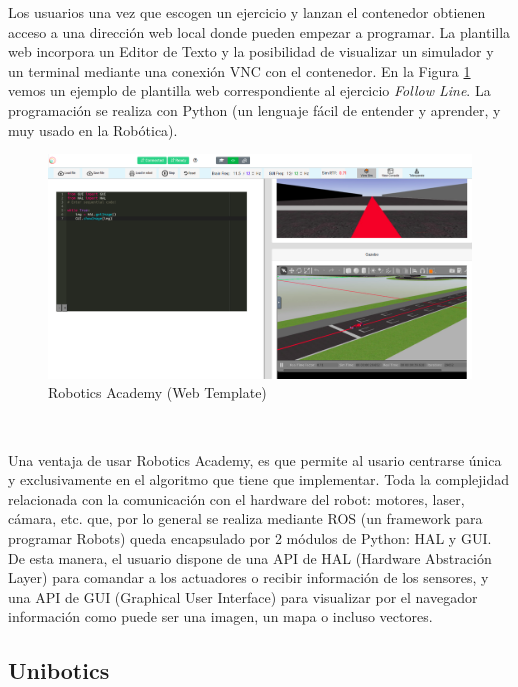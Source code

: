 Los usuarios una vez que escogen un ejercicio y lanzan el contenedor obtienen acceso a una dirección web local donde pueden empezar a programar. La plantilla web incorpora un Editor de Texto y la posibilidad de visualizar un simulador y un terminal mediante una conexión VNC con el contenedor. En la Figura \ref{fig:rob-ac-web-template} vemos un ejemplo de plantilla web correspondiente al ejercicio \textit{Follow Line}. La programación se realiza con Python (un lenguaje fácil de entender y aprender, y muy usado en la Robótica).\\

\begin{figure} [H]
  \begin{center}
    \includegraphics[width=12cm]{imagenes/cap1/robotics-academy-web-template.png}
  \end{center}
  \caption[Robotics Academy (Web Template)]{Robotics Academy (Web Template)}
  \label{fig:rob-ac-web-template}
\end{figure}\

Una ventaja de usar Robotics Academy, es que permite al usario centrarse única y exclusivamente en el algoritmo que tiene que implementar. Toda la complejidad relacionada con la comunicación con el hardware del robot: motores, laser, cámara, etc. que, por lo general se realiza mediante ROS (un framework para programar Robots) queda encapsulado por 2 módulos de Python: HAL y GUI. De esta manera, el usuario dispone de una API de HAL (Hardware Abstración Layer) para comandar a los actuadores o recibir información de los sensores, y una API de GUI (Graphical User Interface) para visualizar por el navegador información como puede ser una imagen, un mapa o incluso vectores.\\

\subsection{Unibotics}
\label{sec:unibotics}

